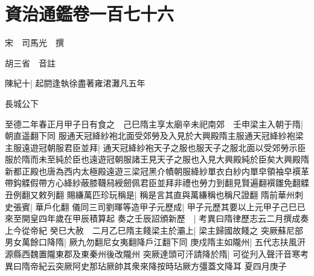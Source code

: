 \section{資治通鑑卷一百七十六}
宋　司馬光　撰

胡三省　音註

陳紀十|{
	起閼逢執徐盡著雍涒灘凡五年}


長城公下

至德二年春正月甲子日有食之　己巳隋主享太廟辛未祀南郊　壬申梁主入朝于隋|{
	朝直遥翻下同}
服通天冠絳紗袍北面受郊勞及入見於大興殿隋主服通天冠絳紗袍梁主服遠遊冠朝服君臣並拜|{
	通天冠絳紗袍天子之服也服天子之服北面以受郊勞示臣服於隋而未至純於臣也遠遊冠朝服諸王見天子之服也入見大興殿純於臣矣大興殿隋新都正殿也唐為西内太極殿遠遊三梁冠黑介幘朝服絳紗單衣白紗内單皁領袖皁襈革帶鈎䚢假帶方心絳紗蔽膝韈舄綬劒佩君臣並拜非禮也勞力到翻見賢遍翻襈雛免翻䚢丑例翻又敕列翻}
賜縑萬匹珍玩稱是|{
	稱是言其直與萬縑稱也稱尺證翻}
隋前華州刺史張賓|{
	華戶化翻}
儀同三司劉暉等造甲子元歷成|{
	甲子元歷其要以上元甲子己巳已來至開皇四年歲在甲辰積算起}
奏之壬辰詔頒新歷　|{
	考異曰隋律歷志云二月撰成奏上今從帝紀}
癸巳大赦　二月乙巳隋主餞梁主於灞上|{
	梁主歸國故餞之}
突厥蘇尼部男女萬餘口降隋|{
	厥九勿翻尼女夷翻降戶江翻下同}
庚戍隋主如隴州|{
	五代志扶風汧源縣西魏置隴東郡及東秦州後改隴州}
突厥達頭可汗請降於隋|{
	可從刋入聲汗音寒考異曰隋帝紀云突厥阿史那玷厥帥其衆來降按時玷厥方彊蓋文降耳}
夏四月庚子

